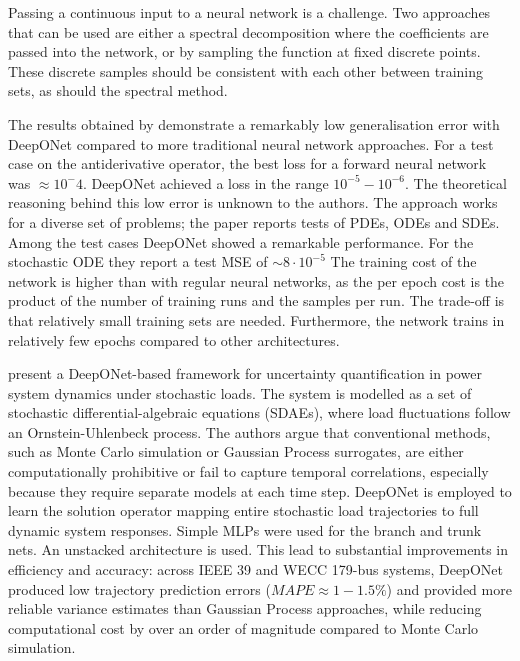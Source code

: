 Passing a continuous input to a neural network is a challenge. Two approaches that can be used are either a spectral
decomposition where the coefficients are passed into the network, or by sampling the function at fixed discrete points.
These discrete samples should be consistent with each other between training sets, as should the spectral method. 

The results obtained by \textcite{luLearningNonlinearOperators2021} demonstrate a remarkably low generalisation error
with DeepONet compared to more traditional neural network approaches. For a test case on the antiderivative operator,
the best loss for a forward neural network was \(\approx 10^ - 4\). DeepONet achieved a loss in the range \(10^{-5} -
10^{-6}\). The theoretical reasoning behind this low error is unknown to the authors. The approach works for a diverse
set of problems; the paper reports tests of PDEs, ODEs and SDEs. Among the test cases DeepONet showed a remarkable
performance. For the stochastic ODE they report a test MSE of \(\sim 8 \cdot 10^{-5} \) The training cost of the network
is higher than with regular neural networks, as the per epoch cost is the product of the number of training runs and the
samples per run. The trade-off is that relatively small training sets are needed. Furthermore, the network trains in
relatively few epochs compared to other architectures.

\textcite{yeDeepONetBasedUncertainty2023} present a DeepONet-based framework for uncertainty quantification in power
system dynamics under stochastic loads. The system is modelled as a set of stochastic differential-algebraic equations
(SDAEs), where load fluctuations follow an Ornstein-Uhlenbeck process. The authors argue that conventional methods, such
as Monte Carlo simulation or Gaussian Process surrogates, are either computationally prohibitive or fail to capture
temporal correlations, especially because they require separate models at each time step. DeepONet is employed to learn
the solution operator mapping entire stochastic load trajectories to full dynamic system responses. Simple MLPs were
used for the branch and trunk nets. An unstacked architecture is used. This lead to
substantial improvements in efficiency and accuracy: across IEEE 39 and WECC 179-bus systems, DeepONet produced low
trajectory prediction errors (\(MAPE \approx 1-1.5\%\)) and provided more reliable variance estimates than Gaussian
Process approaches, while reducing computational cost by over an order of magnitude compared to Monte Carlo simulation.

